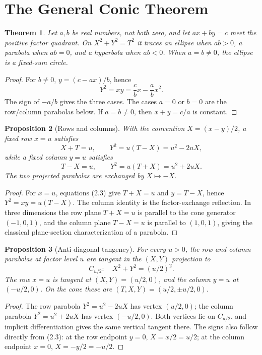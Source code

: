 \documentclass[11pt]{amsart}
\newtheorem{theorem}{Theorem}[section]
\newtheorem{proposition}[theorem]{Proposition}
\theoremstyle{remark}
\begin{document}
\section{The General Conic Theorem}
\begin{theorem}\label{thm:conic}
Let $a,b$ be real numbers, not both zero, and let $ax+by=c$ meet the positive factor quadrant. On $X^2+Y^2=T^2$ it traces an ellipse when $ab>0$, a parabola when $ab=0$, and a hyperbola when $ab<0$. When $a=b\ne0$, the ellipse is a fixed-sum circle.
\end{theorem}
\begin{proof}
For $b\ne0$, $y=(c-ax)/b$, hence
\[
Y^2=xy=\frac cbx-\frac abx^2.
\]
The sign of $-a/b$ gives the three cases. The cases $a=0$ or $b=0$ are the row/column parabolas below. If $a=b\ne0$, then $x+y=c/a$ is constant.
\end{proof}

\begin{proposition}[Rows and columns]\label{prop:rows}
With the convention $X=(x-y)/2$, a fixed row $x=u$ satisfies
\[
X+T=u,\qquad Y^2=u(T-X)=u^2-2uX,
\]
while a fixed column $y=u$ satisfies
\[
T-X=u,\qquad Y^2=u(T+X)=u^2+2uX.
\]
The two projected parabolas are exchanged by $X\mapsto-X$.
\end{proposition}

\begin{proof}
For $x=u$, equations (2.3) give $T+X=u$ and $y=T-X$, hence $Y^2=xy=u(T-X)$. The column identity is the factor-exchange reflection. In three dimensions the row plane $T+X=u$ is parallel to the cone generator $(-1,0,1)$, and the column plane $T-X=u$ is parallel to $(1,0,1)$, giving the classical plane-section characterization of a parabola.
\end{proof}

\begin{proposition}[Anti-diagonal tangency]\label{prop:tangent}
For every $u>0$, the row and column parabolas at factor level $u$ are tangent in the $(X,Y)$ projection to
\[
C_{u/2}:\quad X^2+Y^2=(u/2)^2.
\]
The row $x=u$ is tangent at $(X,Y)=(u/2,0)$, and the column $y=u$ at $(-u/2,0)$. On the cone these are $(T,X,Y)=(u/2,\pm u/2,0)$.
\end{proposition}
\begin{proof}
The row parabola $Y^2=u^2-2uX$ has vertex $(u/2,0)$; the column parabola $Y^2=u^2+2uX$ has vertex $(-u/2,0)$. Both vertices lie on $C_{u/2}$, and implicit differentiation gives the same vertical tangent there. The signs also follow directly from (2.3): at the row endpoint $y=0$, $X=x/2=u/2$; at the column endpoint $x=0$, $X=-y/2=-u/2$.
\end{proof}
\end{document}
